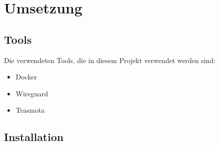 \chapter{Umsetzung}
\section{Tools}
Die verwendeten Tools, die in diesem Projekt verwendet werden sind:
\begin{itemize}
    \item Docker
    \item Wireguard
    \item Trasmota
\end{itemize}
\section{Installation}
